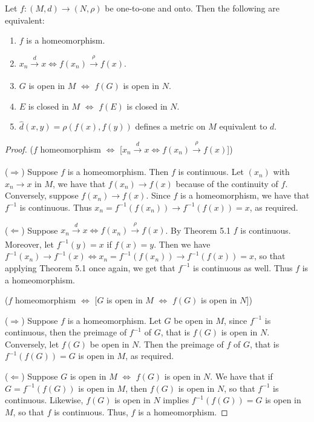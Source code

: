 \begin{exercise}{52}
Let $f:(M,d)\to(N,\rho)$ be one-to-one and onto.
Then the following are equivalent:
\begin{enumerate}
    \item $f$ is a homeomorphism.
    \item $x_n\xrightarrow[]{d}x \iff f(x_n)\xrightarrow[]{\rho}f(x)$.
    \item $G$ is open in $M$ $\iff$ $f(G)$ is open in $N$.
    \item $E$ is closed in $M$ $\iff$ $f(E)$ is closed in $N$.
    \item $\hat{d}(x,y)=\rho(f(x),f(y))$ defines a metric on $M$ equivalent to $d$.
\end{enumerate}
\end{exercise}
\begin{proof}
($f$ homeomorphism $\iff$ [$x_n\xrightarrow[]{d}x \iff f(x_n)\xrightarrow[]{\rho}f(x)$])

($\Rightarrow$)
Suppose $f$ is a homeomorphism.
Then $f$ is continuous.
Let $(x_n)$ with $x_n\to x$ in $M$, we have that $f(x_n)\to f(x)$ because of the continuity of $f$.
Conversely, suppose $f(x_n)\to f(x)$.
Since $f$ is a homeomorphism, we have that $f^{-1}$ is continuous.
Thus $x_n = f^{-1}(f(x_n)) \to f^{-1}(f(x)) = x$, as required.

($\Leftarrow$)
Suppose $x_n\xrightarrow[]{d}x \iff f(x_n)\xrightarrow[]{\rho}f(x)$.
By Theorem 5.1 $f$ is continuous.
Moreover, let $f^{-1}(y)=x$ if $f(x)=y$.
Then we have $f^{-1}(x_n)\to f^{-1}(x) \iff x_n = f^{-1}(f(x_n)) \to f^{-1}(f(x)) = x$, so that applying Theorem 5.1 once again, we get that $f^{-1}$ is continuous as well.
Thus $f$ is a homeomorphism.

($f$ homeomorphism $\iff$ [$G$ is open in $M$ $\iff$ $f(G)$ is open in $N$])

($\Rightarrow$)
Suppose $f$ is a homeomorphism.
Let $G$ be open in $M$, since $f^{-1}$ is continuous, then the preimage of $f^{-1}$ of $G$, that is $f(G)$ is open in $N$.
Conversely, let $f(G)$ be open in $N$.
Then the preimage of $f$ of $G$, that is $f^{-1}(f(G))=G$ is open in $M$, as required.

($\Leftarrow$)
Suppose $G$ is open in $M$ $\iff$ $f(G)$ is open in $N$.
We have that if $G=f^{-1}(f(G))$ is open in $M$, then $f(G)$ is open in $N$, so that $f^{-1}$ is continuous. 
Likewise, $f(G)$ is open in $N$ implies $f^{-1}(f(G))=G$ is open in $M$, so that $f$ is continuous.
Thus, $f$ is a homeomorphism.


\end{proof}
